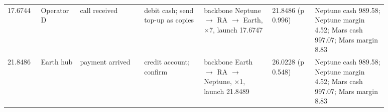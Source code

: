 {\begin{longtable}{@{}p{0.07\linewidth}p{0.09\linewidth}p{0.15\linewidth}p{0.14\linewidth}p{0.16\linewidth}p{0.1\linewidth}p{0.17\linewidth}@{}}
17.6744 & Operator D & call received & debit cash; send top-up as copies & backbone Neptune $\to$ RA $\to$ Earth, $\times$7, launch 17.6747 & 21.8486 (p 0.996) & Neptune cash 989.58; Neptune margin 4.52; Mars cash 997.07; Mars margin 8.83 \\
21.8486 & Earth hub & payment arrived & credit account; confirm & backbone Earth $\to$ RA $\to$ Neptune, $\times$1, launch 21.8489 & 26.0228 (p 0.548) & Neptune cash 989.58; Neptune margin 4.52; Mars cash 997.07; Mars margin 8.83 \\
\bottomrule
\end{longtable}}

